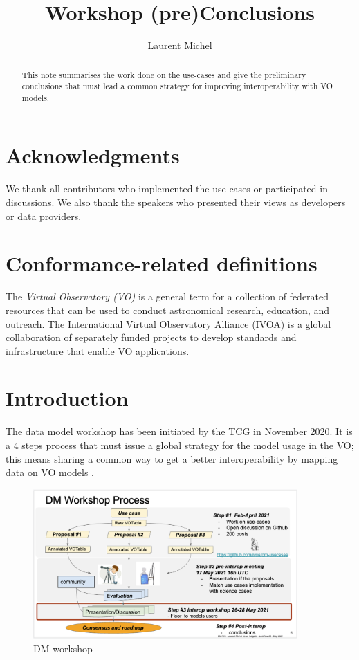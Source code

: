 \documentclass[11pt,a4paper]{ivoa}
\title{Workshop (pre)Conclusions}
\author{Laurent Michel}
\begin{document}
\begin{abstract}
This note summarises the work done on the use-cases and give the preliminary conclusions that must lead a common strategy for improving interoperability with VO models.
\end{abstract}


\section*{Acknowledgments}

We thank all contributors who implemented the use cases or participated in discussions. 
We also thank the speakers who presented their views as developers or data providers.

\section*{Conformance-related definitions}

The \emph{Virtual Observatory (VO)} is a
general term for a collection of federated resources that can be used
to conduct astronomical research, education, and outreach.
The \href{https://www.ivoa.net}{International
Virtual Observatory Alliance (IVOA)} is a global
collaboration of separately funded projects to develop standards and
infrastructure that enable VO applications.

\section{Introduction}

The data model workshop has been initiated by the TCG in November 2020.
It is a 4 steps process that must issue a global strategy for the model usage in the VO; this means sharing a common way to get a better interoperability by mapping data on VO models .

\begin{figure}
\centering

\includegraphics[width=0.9\textwidth]{fig1.png}
\caption{DM workshop}
\label{fig:workshop}
\end{figure}
\end{document}
